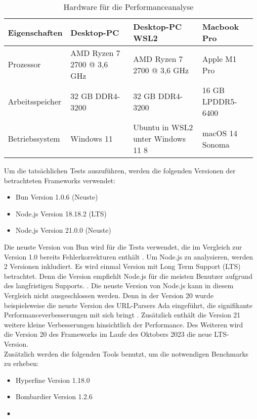 \begin{table}[h]
	\centering
	\begin{tabular}{|p{3cm}|p{3cm}|p{3cm}|p{3cm}|}
		\hline
		Eigenschaften & Desktop-PC & Desktop-PC WSL2 & Macbook Pro \\
		\hline
		Prozessor & AMD Ryzen 7 2700 @ 3,6 GHz & AMD Ryzen 7 2700 @ 3,6 GHz & Apple M1 Pro \\
		\hline
		Arbeitsspeicher & 32 GB DDR4-3200 & 32 GB DDR4-3200 & 16 GB LPDDR5-6400 \\
		\hline
		Betriebssystem & Windows 11 & Ubuntu in WSL2 unter Windows 11 8 & macOS 14 Sonoma \\
		\hline
	\end{tabular}
	\caption{Hardware für die Performanceanalyse}
	\label{table:hardware}
\end{table}

\noindent
Um die tatsächlichen Tests auszuführen, werden die folgenden Versionen der betrachteten Frameworks verwendet:
\begin{itemize}
	\item Bun Version 1.0.6 (Neuste)
	\item Node.js Version 18.18.2 (LTS)
	\item Node.js Version 21.0.0 (Neuste)
\end{itemize}

\noindent
Die neuste Version von Bun wird für die Tests verwendet, die im Vergleich zur Version 1.0 bereits Fehlerkorrekturen enthält \cite{Sumner.2023}. Um Node.js zu analysieren, werden 2 Versionen inkludiert. Es wird einmal Version mit Long Term Support (LTS) betrachtet. Denn die Version empfiehlt Node.js für die meisten Benutzer aufgrund des langfristigen Supports. .\cite{OpenJSFoundation.o.J.} Die neuste Version von Node.js kann in diesem Vergleich nicht ausgeschlossen werden. Denn in der Version 20 wurde beispielsweise die neuste Version des URL-Parsers Ada eingeführt, die signifikante Performanceverbesserungen mit sich bringt \cite{OpenJSFoundation.2023}. Zusätzlich enthält die Version 21 weitere kleine Verbesserungen hinsichtlich der Performance. Des Weiteren wird die Version 20 des Frameworks im Laufe des Oktobers 2023 die neue LTS-Version. \cite{OpenJSFoundation.2023b}\\

\noindent
Zusätzlich werden die folgenden Tools benutzt, um die notwendigen Benchmarks zu erheben:
\begin{itemize}
	\item Hyperfine Version 1.18.0
	\item Bombardier Version 1.2.6
	\item {}
\end{itemize}

